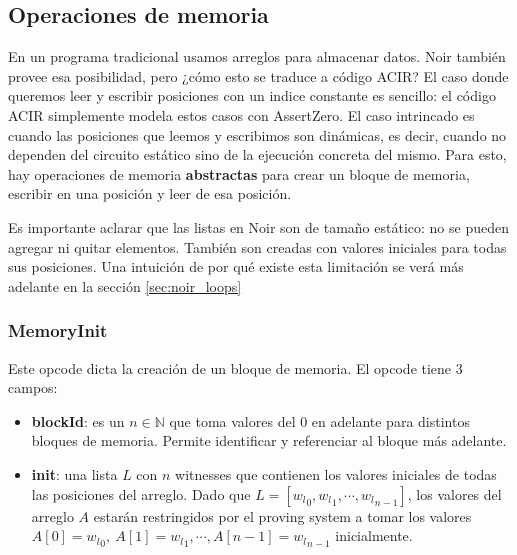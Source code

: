 \subsection{Operaciones de memoria}\label{sec:acir_memoria}
En un programa tradicional usamos arreglos para almacenar datos. Noir también provee esa posibilidad, pero ¿cómo esto se traduce a código ACIR? El caso donde queremos leer y escribir posiciones con un indice constante es sencillo: el código ACIR simplemente modela estos casos con AssertZero. El caso intrincado es cuando las posiciones que leemos y escribimos son dinámicas, es decir, cuando no dependen del circuito estático sino de la ejecución concreta del mismo. Para esto, hay operaciones de memoria \textbf{abstractas} para crear un bloque de memoria, escribir en una posición y leer de esa posición. 

Es importante aclarar que las listas en Noir son de tamaño estático: no se pueden agregar ni quitar elementos. También son creadas con valores iniciales para todas sus posiciones. Una intuición de por qué existe esta limitación se verá más adelante en la sección \ref{sec:noir_loops}

\subsubsection{\textbf{MemoryInit}}
Este opcode dicta la creación de un bloque de memoria. El opcode tiene 3 campos:
\begin{itemize}
    \item \textbf{blockId}: es un $n \in \mathbb{N}$ que toma valores del $0$ en adelante para distintos bloques de memoria. Permite identificar y referenciar al bloque más adelante. 
    \item \textbf{init}: una lista $L$ con $n$ witnesses que contienen los valores iniciales de todas las posiciones del arreglo. Dado que $L = [{w_l}_0, {w_l}_1, \cdots, {w_l}_{n-1}]$, los valores del arreglo $A$ estarán restringidos por el proving system a tomar los valores $A[0] = {w_l}_0, ~ A[1]={w_l}_1, \cdots, A[n-1] = {w_l}_{n-1}$ inicialmente. 
\end{itemize}

